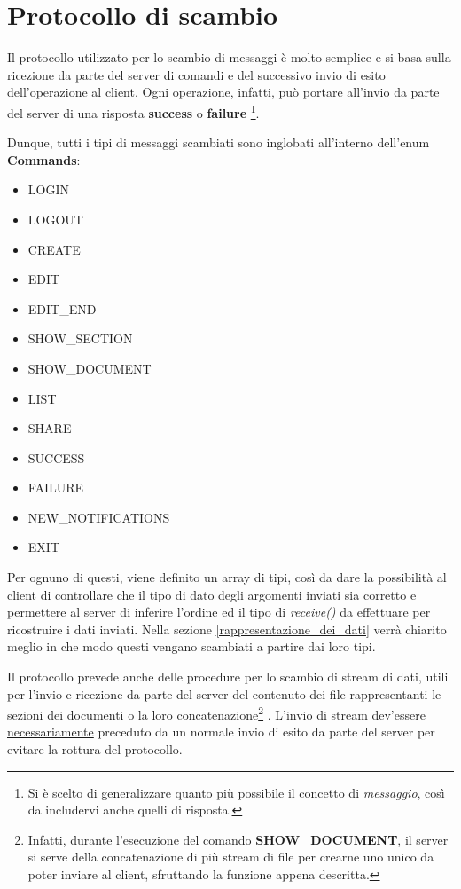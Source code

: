 \section{Protocollo di scambio}
Il protocollo utilizzato per lo scambio di messaggi è molto semplice e si basa sulla ricezione da parte del server di comandi e del successivo invio di esito dell'operazione al client. Ogni operazione, infatti, può portare all'invio da parte del server di una risposta \textbf{success} o \textbf{failure} \footnote{Si è scelto di generalizzare quanto più possibile il concetto di \textit{messaggio}, così da includervi anche quelli di risposta.}.

Dunque, tutti i tipi di messaggi scambiati sono inglobati all'interno dell'enum \textbf{Commands}:
\begin{multicols}{2}
	\begin{itemize}
		\item LOGIN
		\item LOGOUT
		\item CREATE
		\item EDIT
		\item EDIT\_END
		\item SHOW\_SECTION
		\item SHOW\_DOCUMENT
	\end{itemize}
	\begin{itemize}
		\item LIST
		\item SHARE
		\item SUCCESS
		\item FAILURE
		\item NEW\_NOTIFICATIONS
		\item EXIT
	\end{itemize}
\end{multicols}
Per ognuno di questi, viene definito un array di tipi, così da dare la possibilità al client di controllare che il tipo di dato degli argomenti inviati sia corretto e permettere al server di inferire l'ordine ed il tipo di \textit{receive()} da effettuare per ricostruire i dati inviati. Nella sezione \ref{rappresentazione_dei_dati} verrà chiarito meglio in che modo questi vengano scambiati a partire dai loro tipi.

Il protocollo prevede anche delle procedure per lo scambio di stream di dati, utili per l'invio e ricezione da parte del server del contenuto dei file rappresentanti le sezioni dei documenti o la loro concatenazione\footnote{Infatti, durante l'esecuzione del comando \textbf{SHOW\_DOCUMENT}, il server si serve della concatenazione di più stream di file per crearne uno unico da poter inviare al client, sfruttando la funzione appena descritta.} .
L'invio di stream dev'essere \underline{necessariamente} preceduto da un normale invio di esito da parte del server per evitare la rottura del protocollo.

